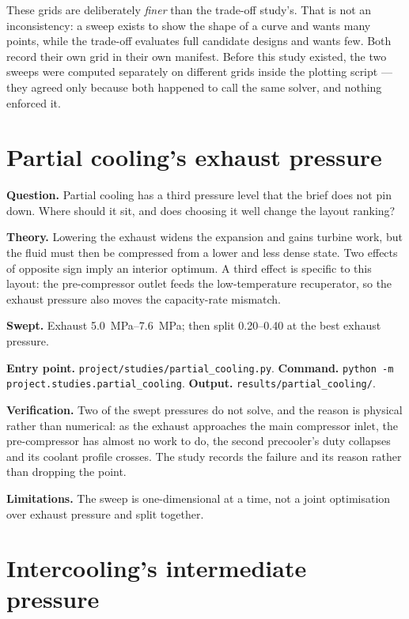 \documentclass[11pt,a4paper]{report}
\newcommand{\code}[1]{\texttt{\small #1}}
\begin{document}
\begin{caveat}
These grids are deliberately \emph{finer} than the trade-off study's.
That is not an inconsistency: a sweep exists to show the shape of a
curve and wants many points, while the trade-off evaluates full
candidate designs and wants few. Both record their own grid in their own
manifest. Before this study existed, the two sweeps were computed
separately on different grids inside the plotting script --- they agreed
only because both happened to call the same solver, and nothing enforced
it.
\end{caveat}

\section{Partial cooling's exhaust pressure}

\textbf{Question.} Partial cooling has a third pressure level that the
brief does not pin down. Where should it sit, and does choosing it well
change the layout ranking?

\textbf{Theory.} Lowering the exhaust widens the expansion and gains
turbine work, but the fluid must then be compressed from a lower and
less dense state. Two effects of opposite sign imply an interior
optimum. A third effect is specific to this layout: the pre-compressor
outlet feeds the low-temperature recuperator, so the exhaust pressure
also moves the capacity-rate mismatch.

\textbf{Swept.} Exhaust \SIrange{5.0}{7.6}{\mega\pascal}; then split
\numrange{0.20}{0.40} at the best exhaust pressure.

\textbf{Entry point.} \code{project/studies/partial\_cooling.py}.
\textbf{Command.} \code{python -m project.studies.partial\_cooling}.
\textbf{Output.} \code{results/partial\_cooling/}.

\textbf{Verification.} Two of the swept pressures do not solve, and the
reason is physical rather than numerical: as the exhaust approaches the
main compressor inlet, the pre-compressor has almost no work to do, the
second precooler's duty collapses and its coolant profile crosses. The
study records the failure and its reason rather than dropping the point.

\textbf{Limitations.} The sweep is one-dimensional at a time, not a
joint optimisation over exhaust pressure and split together.

\section{Intercooling's intermediate pressure}
\end{document}
